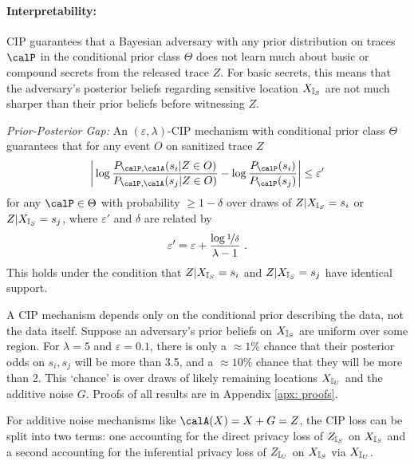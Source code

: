 \paragraph{Interpretability:} CIP guarantees that a Bayesian adversary with any prior distribution on traces $\calP$ in the conditional prior class $\Theta$ does not learn much about basic or compound secrets from the released trace $Z$. For basic secrets, this means that the adversary's posterior beliefs regarding sensitive location ${X_{\mathbb{I}_S}}$ are not much sharper than their prior beliefs before witnessing $Z$.  
\begin{theorem} \emph{Prior-Posterior Gap:} 
\label{thm: prior-posterior}
	An $(\varepsilon, \lambda)$-CIP mechanism with conditional prior class $\Theta$ guarantees that for any event $O$ on sanitized trace $Z$
	\begin{align*}
		\bigg| \log \frac{P_{\calP, \calA}(s_i | Z \in O)}{P_{\calP, \calA}(s_j | Z \in O)} - \log \frac{P_{\calP}(s_i)}{P_{\calP}(s_j)} \bigg| \leq \varepsilon'
	\end{align*}
	for any $\calP \in \Theta$ with probability $\geq 1 - \delta$ over draws of $Z|{X_{\mathbb{I}_S}}=s_i$ or $Z|{X_{\mathbb{I}_S}}=s_j$, where $\varepsilon'$ and $\delta$ are related by
	\begin{align*}
		\varepsilon' = \varepsilon + \frac{\log \nicefrac{1}{\delta}}{\lambda - 1} \ .
	\end{align*}
	This holds under the condition that $Z|{X_{\mathbb{I}_S}} = s_i$ and $Z|{X_{\mathbb{I}_S}} = s_j$ have identical support. 
\end{theorem}
A CIP mechanism depends only on the conditional prior describing the data, not the data itself. Suppose an adversary's prior beliefs on ${X_{\mathbb{I}_S}}$ are uniform over some region. For $\lambda = 5$ and $\varepsilon = 0.1$, there is only a $\approx 1\%$ chance that their posterior odds on $s_i,s_j$ will be more than 3.5, and a $\approx 10\%$ chance that they will be more than 2. This `chance' is over draws of likely remaining locations ${X_{\mathbb{I}_U}}$ and the additive noise $G$.  Proofs of all results are in Appendix \ref{apx: proofs}.

For additive noise mechanisms like $\calA(X) = X + G = Z$, the CIP loss can be split into two terms: one accounting for the direct privacy loss of ${Z_{\mathbb{I}_S}}$ on ${X_{\mathbb{I}_S}}$ and a second accounting for the inferential privacy loss of ${Z_{\mathbb{I}_U}}$ on ${X_{\mathbb{I}_S}}$ via ${X_{\mathbb{I}_U}}$.

